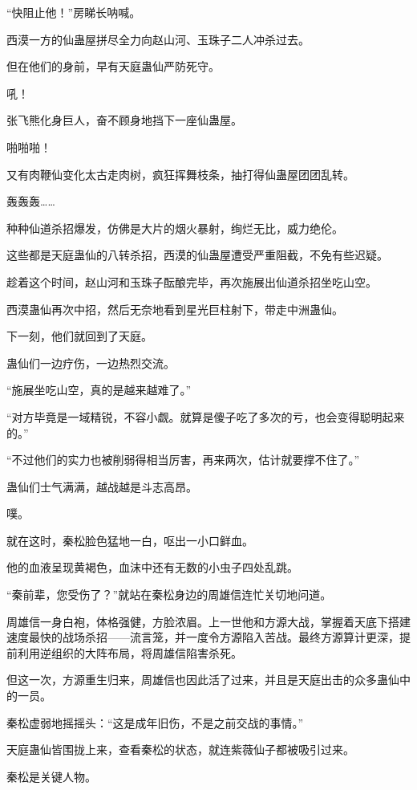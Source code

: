 
\begin{this_body}

“快阻止他！”房睇长呐喊。

西漠一方的仙蛊屋拼尽全力向赵山河、玉珠子二人冲杀过去。

但在他们的身前，早有天庭蛊仙严防死守。

吼！

张飞熊化身巨人，奋不顾身地挡下一座仙蛊屋。

啪啪啪！

又有肉鞭仙变化太古走肉树，疯狂挥舞枝条，抽打得仙蛊屋团团乱转。

轰轰轰……

种种仙道杀招爆发，仿佛是大片的烟火暴射，绚烂无比，威力绝伦。

这些都是天庭蛊仙的八转杀招，西漠的仙蛊屋遭受严重阻截，不免有些迟疑。

趁着这个时间，赵山河和玉珠子酝酿完毕，再次施展出仙道杀招坐吃山空。

西漠蛊仙再次中招，然后无奈地看到星光巨柱射下，带走中洲蛊仙。

下一刻，他们就回到了天庭。

蛊仙们一边疗伤，一边热烈交流。

“施展坐吃山空，真的是越来越难了。”

“对方毕竟是一域精锐，不容小觑。就算是傻子吃了多次的亏，也会变得聪明起来的。”

“不过他们的实力也被削弱得相当厉害，再来两次，估计就要撑不住了。”

蛊仙们士气满满，越战越是斗志高昂。

噗。

就在这时，秦松脸色猛地一白，呕出一小口鲜血。

他的血液呈现黄褐色，血沫中还有无数的小虫子四处乱跳。

“秦前辈，您受伤了？”就站在秦松身边的周雄信连忙关切地问道。

周雄信一身白袍，体格强健，方脸浓眉。上一世他和方源大战，掌握着天底下搭建速度最快的战场杀招——流言笼，并一度令方源陷入苦战。最终方源算计更深，提前利用逆组织的大阵布局，将周雄信陷害杀死。

但这一次，方源重生归来，周雄信也因此活了过来，并且是天庭出击的众多蛊仙中的一员。

秦松虚弱地摇摇头：“这是成年旧伤，不是之前交战的事情。”

天庭蛊仙皆围拢上来，查看秦松的状态，就连紫薇仙子都被吸引过来。

秦松是关键人物。


\end{this_body}

